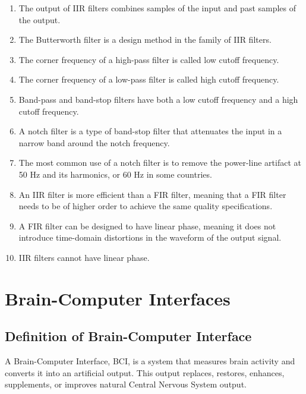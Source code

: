\begin{enumerate}[label=\arabic*.]
    \item The output of IIR filters combines samples of the input and past samples of the output.
    
    \item The Butterworth filter is a design method in the family of IIR filters.
    
    \item The corner frequency of a high-pass filter is called low cutoff frequency.
    
    \item The corner frequency of a low-pass filter is called high cutoff frequency.
    
    \item Band-pass and band-stop filters have both a low cutoff frequency and a high cutoff frequency.
    
    \item A notch filter is a type of band-stop filter that attenuates the input in a narrow band around the notch frequency.
    
    \item The most common use of a notch filter is to remove the power-line artifact at 50 Hz and its harmonics, or 60 Hz in some countries.
    
    \item An IIR filter is more efficient than a FIR filter, meaning that a FIR filter needs to be of higher order to achieve the same quality specifications.
    
    \item A FIR filter can be designed to have linear phase, meaning it does not introduce time-domain distortions in the waveform of the output signal.
    
    \item IIR filters cannot have linear phase.
\end{enumerate}

\section{Brain-Computer Interfaces}

\subsection{Definition of Brain-Computer Interface}

A Brain-Computer Interface, BCI, is a system that measures brain activity and converts it into an artificial output. This output replaces, restores, enhances, supplements, or improves natural Central Nervous System output.


